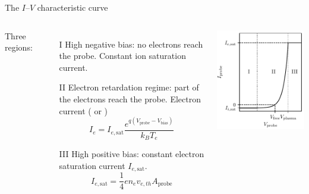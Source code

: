 \documentclass[10pt]{beamer}
\newcommand{\electronsaturationcurrent}[0]{\ensuremath{I_{e,{\mathrm{sat}}}}}
\newcommand{\biasvoltage}{\ensuremath{V_{\mathrm{bias}}}}
\newcommand{\probevoltage}{\ensuremath{V_{\mathrm{probe}}}}
\begin{document}
\begin{frame}{The $I$--$V$ characteristic curve}
    \begin{columns}
        Three regions:
        \begin{enumerate}
            \item[I] High negative bias: no electrons reach the probe. Constant ion saturation current.
            \item[II] Electron retardation regime: part of the electrons reach the probe. Electron current ( or )
            \begin{equation*}
                I_e = \electronsaturationcurrent \frac{e^{q(\probevoltage - \biasvoltage)}}{k_B T_e}
            \end{equation*}
            \item[III] High positive bias: constant electron saturation current $\electronsaturationcurrent$.
            \begin{equation*}
                \electronsaturationcurrent = \frac{1}{4}e n_e v_{e,th} A_{\mathrm{probe}}
            \end{equation*}
        \end{enumerate}
        \includegraphics[scale=1]{../figures/langmuir_characteristic.pdf}
    \end{columns}
\end{frame}
\end{document}
